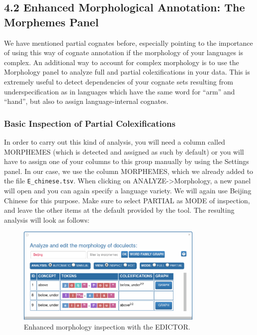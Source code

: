 \documentclass[a4paper,svgnames]{scrartcl}
\begin{document}
\subsection*{4.2 Enhanced Morphological Annotation: The Morphemes
Panel}\label{enhanced-morphological-annotation-the-morphemes-panel}

We have mentioned partial cognates before, especially pointing to the
importance of using this way of cognate annotation if the morphology of
your languages is complex. An additional way to account for complex
morphology is to use the Morphology panel to analyze full and partial
colexifications in your data. This is extremely useful to detect
dependencies of your cognate sets resulting from underspecification as
in languages which have the same word for ``arm'' and ``hand'', but also
to assign language-internal cognates.

\subsubsection{Basic Inspection of Partial
Colexifications}\label{basic-inspection-of-partial-colexifications}

In order to carry out this kind of analysis, you will need a column
called MORPHEMES (which is detected and assigned as such by default) or
you will have to assign one of your columns to this group manually by
using the Settings panel. In our case, we use the column MORPHEMES,
which we already added to the file \texttt{E\_chinese.tsv}. When
clicking on ANALYZE-\textgreater{}Morphology, a new panel will open and
you can again specify a language variety. We will again use Beijing
Chinese for this purpose. Make sure to select PARTIAL as MODE of
inspection, and leave the other items at the default provided by the
tool. The resulting analysis will look as follows:

\begin{figure}
\centering
\includegraphics[width=0.8\textwidth]{images/figure-16.png}
\caption{Enhanced morphology inspection with the EDICTOR.}
\end{figure}
\end{document}
